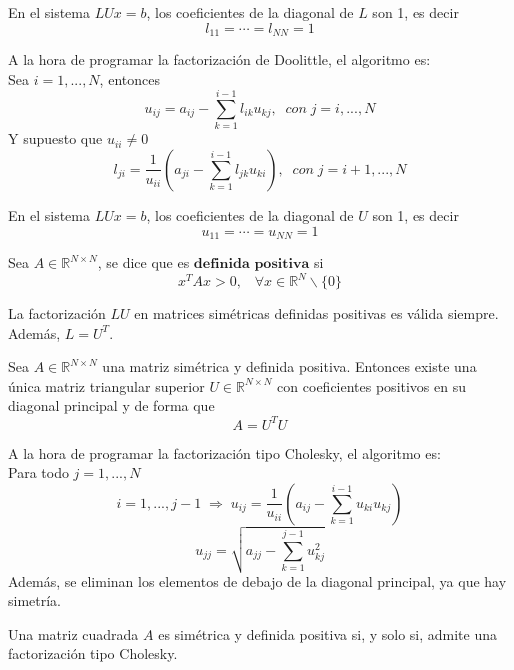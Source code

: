 \begin{ndef}
			En el sistema $LUx = b$, los coeficientes de la diagonal de $L$ son 1, es decir
\[ l_{11} = \cdots = l_{NN} = 1 \]
\end{ndef}
			
A la hora de programar la factorización de Doolittle, el algoritmo es:\\
Sea $i = 1,...,N$, entonces
\[ u_{ij} = a_{ij} - \sum_{k=1}^{i-1} l_{ik}u_{kj}, \; \; con \; j = i,...,N \]
Y supuesto que $u_{ii} \neq 0$
\[ l_{ji} = \frac{1}{u_{ii}} \left( a_{ji} - \sum_{k=1}^{i-1} l_{jk}u_{ki} \right), \; \; con \; j = i+1,...,N \]			
			
\begin{ndef}
En el sistema $LUx = b$, los coeficientes de la diagonal de $U$ son 1, es decir
\[ u_{11} = \cdots = u_{NN} = 1 \]
\end{ndef}
			
\begin{ndef}
Sea $A \in \mathbb{R}^{N \times N}$, se dice que es $\textbf{definida positiva}$ si
\[ x^TAx > 0, \; \; \; \forall x \in \mathbb{R}^N \backslash \lbrace 0 \rbrace \]
\end{ndef}
			
La factorización $LU$ en matrices simétricas definidas positivas es válida siempre. Además, $L = U^T$.
			
\begin{ndef}
Sea $A \in \mathbb{R}^{N \times N}$ una matriz simétrica y definida positiva. Entonces existe una única matriz triangular superior $U \in \mathbb{R}^{N \times N}$ con coeficientes positivos en su diagonal principal y de forma que
\[ A = U^TU \]
\end{ndef}
			
A la hora de programar la factorización tipo Cholesky, el algoritmo es:\\
Para todo $j = 1,...,N$
\[ i = 1,...,j-1 \; \Rightarrow \; u_{ij} = \frac{1}{u_{ii}} \left( a_{ij} - \sum_{k=1}^{i-1} u_{ki}u_{kj} \right) \]
\[ u_{jj} = \sqrt{a_{jj} - \sum_{k=1}^{j-1}u_{kj}^2} \]
Además, se eliminan los elementos de debajo de la diagonal principal, ya que hay simetría.
			
\begin{nprop}
Una matriz cuadrada $A$ es simétrica y definida positiva si, y solo si, admite una factorización tipo Cholesky.
\end{nprop}
		
